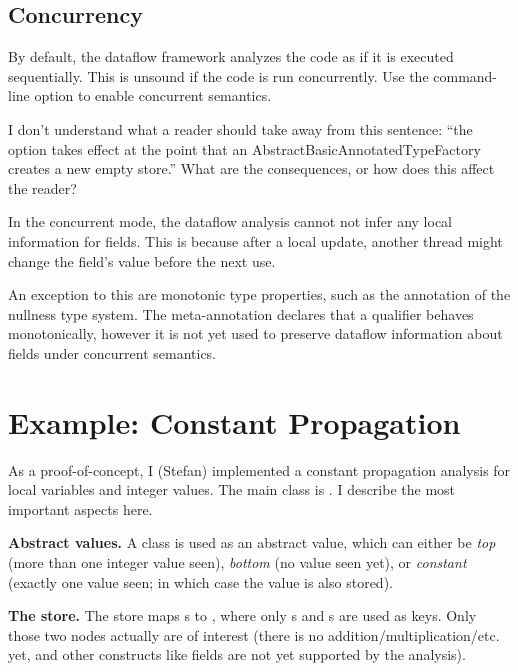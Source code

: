 \subsection{Concurrency}

By default, the dataflow framework analyzes the code as if it is 
executed sequentially.
This is unsound if the code is run concurrently.  Use the
command-line option to enable concurrent semantics.

\begin{workinprogress}
I don't understand what a reader should take away from this sentence:
``the option takes effect at the point that an
AbstractBasicAnnotatedTypeFactory creates a new empty store.''
What are the consequences, or how does this affect the reader?
\end{workinprogress}

In the concurrent mode, the dataflow analysis cannot not infer any local
information for fields.  This is because after a local update, another
thread might change the field's value before the next use.

An exception to this are monotonic type properties, such as the  annotation
of the nullness type system.  The meta-annotation  declares that a qualifier behaves monotonically, however it is not yet used to
preserve dataflow information about fields under concurrent semantics.


\section{Example: Constant Propagation}

    As a proof-of-concept, I (Stefan) implemented a constant propagation analysis for local variables
    and integer values.  The main class is 
    . 
    I describe the most important aspects here.
    
    \textbf{Abstract values.} A class  is used as an abstract value, which can
    either be \emph{top} (more than one integer value seen), \emph{bottom} (no value seen yet),
    or \emph{constant} (exactly one value seen; in which case the value is also stored).
    
    \textbf{The store.} The store maps s to ,
    where only s and s are
    used as keys.  Only those
    two nodes actually are of interest (there is no addition/multiplication/etc. yet, and other constructs like
    fields are not yet supported by the analysis).
    
